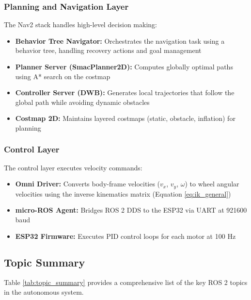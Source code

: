 \subsubsection{Planning and Navigation Layer}
The Nav2 stack handles high-level decision making:
\begin{itemize}
    \item \textbf{Behavior Tree Navigator:} Orchestrates the navigation task using a behavior tree, handling recovery actions and goal management
    \item \textbf{Planner Server (SmacPlanner2D):} Computes globally optimal paths using A* search on the costmap
    \item \textbf{Controller Server (DWB):} Generates local trajectories that follow the global path while avoiding dynamic obstacles
    \item \textbf{Costmap 2D:} Maintains layered costmaps (static, obstacle, inflation) for planning
\end{itemize}

\subsubsection{Control Layer}
The control layer executes velocity commands:
\begin{itemize}
    \item \textbf{Omni Driver:} Converts body-frame velocities ($v_x$, $v_y$, $\omega$) to wheel angular velocities using the inverse kinematics matrix (Equation \ref{eq:ik_general})
    \item \textbf{micro-ROS Agent:} Bridges ROS 2 DDS to the ESP32 via UART at 921600 baud
    \item \textbf{ESP32 Firmware:} Executes PID control loops for each motor at 100 Hz
\end{itemize}

\subsection{Topic Summary}

Table \ref{tab:topic_summary} provides a comprehensive list of the key ROS 2 topics in the autonomous system.

